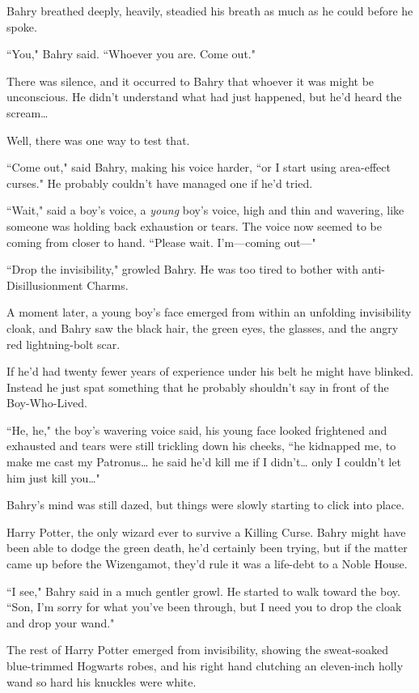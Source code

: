 Bahry breathed deeply, heavily, steadied his breath as much as he could before he spoke.

``You," Bahry said. ``Whoever you are. Come out."

There was silence, and it occurred to Bahry that whoever it was might be unconscious. He didn't understand what had just happened, but he'd heard the scream{\ldots}

Well, there was one way to test that.

``Come out," said Bahry, making his voice harder, ``or I start using area-effect curses." He probably couldn't have managed one if he'd tried.

``Wait," said a boy's voice, a \emph{young} boy's voice, high and thin and wavering, like someone was holding back exhaustion or tears. The voice now seemed to be coming from closer to hand. ``Please wait. I'm—coming out—"

``Drop the invisibility," growled Bahry. He was too tired to bother with anti-Disillusionment Charms.

A moment later, a young boy's face emerged from within an unfolding invisibility cloak, and Bahry saw the black hair, the green eyes, the glasses, and the angry red lightning-bolt scar.

If he'd had twenty fewer years of experience under his belt he might have blinked. Instead he just spat something that he probably shouldn't say in front of the Boy-Who-Lived.

``He, he," the boy's wavering voice said, his young face looked frightened and exhausted and tears were still trickling down his cheeks, ``he kidnapped me, to make me cast my Patronus{\ldots} he said he'd kill me if I didn't{\ldots} only I couldn't let him just kill you{\ldots}"

Bahry's mind was still dazed, but things were slowly starting to click into place.

Harry Potter, the only wizard ever to survive a Killing Curse. Bahry might have been able to dodge the green death, he'd certainly been trying, but if the matter came up before the Wizengamot, they'd rule it was a life-debt to a Noble House.

``I see," Bahry said in a much gentler growl. He started to walk toward the boy. ``Son, I'm sorry for what you've been through, but I need you to drop the cloak and drop your wand."

The rest of Harry Potter emerged from invisibility, showing the sweat-soaked blue-trimmed Hogwarts robes, and his right hand clutching an eleven-inch holly wand so hard his knuckles were white.

